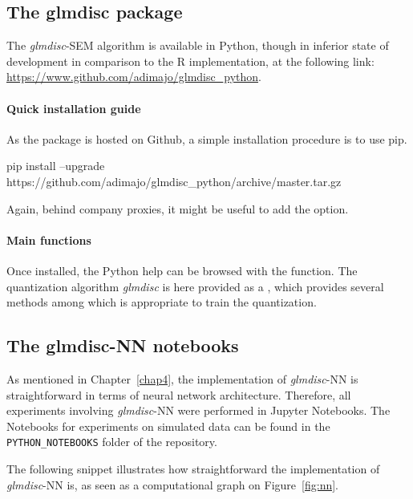 \subsection{The glmdisc package}

The \textit{glmdisc}-SEM algorithm is available in Python, though in inferior state of development in comparison to the \textsf{R} implementation, at the following link: \url{https://www.github.com/adimajo/glmdisc_python}.

\paragraph{Quick installation guide}

As the package is hosted on Github, a simple installation procedure is to use pip.

\begin{bashlisting}
pip install --upgrade https://github.com/adimajo/glmdisc_python/archive/master.tar.gz
\end{bashlisting}

Again, behind company proxies, it might be useful to add the  option.

\paragraph{Main functions}

Once installed, the Python help can be browsed with the  function. The quantization algorithm \textit{glmdisc} is here provided as a , which provides several methods among which  is appropriate to train the quantization.

\subsection{The glmdisc-NN notebooks} \label{app2:nn}

As mentioned in Chapter~\ref{chap4}, the implementation of \textit{glmdisc}-NN is straightforward in terms of neural network architecture. Therefore, all experiments involving \textit{glmdisc}-NN were performed in Jupyter Notebooks. The Notebooks for experiments on simulated data can be found in the \verb|PYTHON_NOTEBOOKS| folder of the repository.

The following snippet illustrates how straightforward the implementation of \textit{glmdisc}-NN is, as seen as a computational graph on Figure~\ref{fig:nn}.

